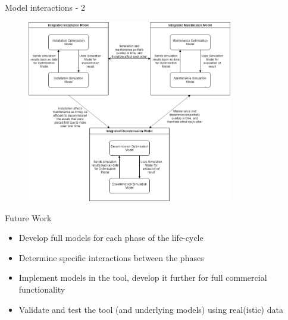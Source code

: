 \documentclass{beamer}
\begin{document}
\begin{frame}{Model interactions - 2}
\begin{figure}[t]
  \includegraphics[width=0.8\textwidth]{flowchart}
\centering
\end{figure}
\end{frame}


\begin{frame}{Future Work}
   \begin{itemize}
  	\item Develop full models for each phase of the life-cycle
  	\item Determine specific interactions between the phases
  	\item Implement models in the tool, develop it further for full commercial functionality
  	\item Validate and test the tool (and underlying models) using real(istic) data
  \end{itemize}
\end{frame}
\end{document}

